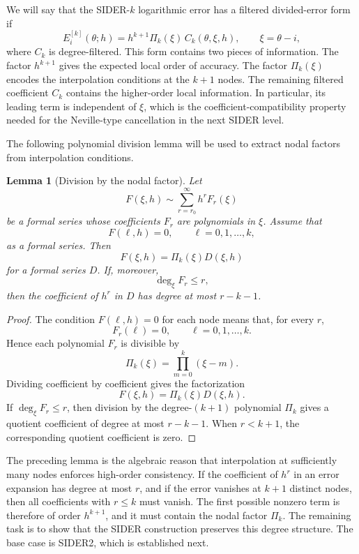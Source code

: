 \documentclass[a4paper,11pt]{article}
\numberwithin{equation}{section}
\theoremstyle{plain}
\newtheorem{lemma}[thm]{Lemma}
\theoremstyle{definition}
\theoremstyle{remark}
\begin{document}
We will say that the SIDER-\(k\) logarithmic error has a filtered
divided-error form if
\begin{equation}
\label{eq:filtered_divided_error_form}
        E_i^{[k]}(\theta;h)
        =
        h^{k+1}\Pi_k(\xi)\,C_k(\theta,\xi,h),
        \qquad \xi=\theta-i,
\end{equation}
where \(C_k\) is degree-filtered.  This form contains two pieces of
information.  The factor \(h^{k+1}\) gives the expected local order of
accuracy.  The factor \(\Pi_k(\xi)\) encodes the interpolation conditions at
the \(k+1\) nodes.  The remaining filtered coefficient \(C_k\) contains the
higher-order local information.  In particular, its leading term is
independent of \(\xi\), which is the coefficient-compatibility property needed
for the Neville-type cancellation in the next SIDER level.

The following polynomial division lemma will be used to extract nodal factors
from interpolation conditions.

\begin{lemma}[Division by the nodal factor]
\label{lem:hadamard_nodal}
Let
\[
        F(\xi,h)\sim \sum_{r=r_0}^{\infty}h^r F_r(\xi)
\]
be a formal series whose coefficients \(F_r\) are polynomials in \(\xi\).
Assume that
\[
        F(\ell,h)=0,\qquad \ell=0,1,\ldots,k,
\]
as a formal series.  Then
\[
        F(\xi,h)=\Pi_k(\xi)D(\xi,h)
\]
for a formal series \(D\).  If, moreover,
\[
        \deg_\xi F_r\leq r,
\]
then the coefficient of \(h^r\) in \(D\) has degree at most \(r-k-1\).
\end{lemma}

\begin{proof}
The condition \(F(\ell,h)=0\) for each node means that, for every \(r\),
\[
        F_r(\ell)=0,\qquad \ell=0,1,\ldots,k.
\]
Hence each polynomial \(F_r\) is divisible by
\[
        \Pi_k(\xi)=\prod_{m=0}^{k}(\xi-m).
\]
Dividing coefficient by coefficient gives the factorization
\[
        F(\xi,h)=\Pi_k(\xi)D(\xi,h).
\]
If \(\deg_\xi F_r\leq r\), then division by the degree-\((k+1)\) polynomial
\(\Pi_k\) gives a quotient coefficient of degree at most \(r-k-1\).  When
\(r<k+1\), the corresponding quotient coefficient is zero.
\end{proof}

The preceding lemma is the algebraic reason that interpolation at sufficiently
many nodes enforces high-order consistency.  If the coefficient of \(h^r\) in
an error expansion has degree at most \(r\), and if the error vanishes at
\(k+1\) distinct nodes, then all coefficients with \(r\leq k\) must vanish.
The first possible nonzero term is therefore of order \(h^{k+1}\), and it
must contain the nodal factor \(\Pi_k\).  The remaining task is to show that
the SIDER construction preserves this degree structure.  The base case is
SIDER2, which is established next.
\end{document}

